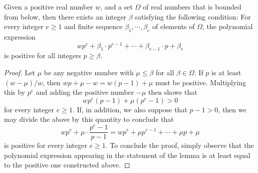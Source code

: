 \documentclass[11pt]{amsart}
\begin{document}
\newpage


\begin{lemma}
\label{positive polynomial: L}
Given a positive real number $w$, and a set $\Omega$ of real numbers that is bounded from below, then there exists an integer $\beta$ satisfying the following condition\textup:  For every integer $e \geq 1$ and finite sequence $\beta_1, \cdots, \beta_e$ of elements of $\Omega$, the polynomial expression \[ wp^{e} + \beta_1 \cdot p^{e-1} + \cdots + \beta_{e-1} \cdot p + \beta_e  \] is positive for all integers $p \geq \beta$.
\end{lemma}


\begin{proof}
Let $\mu$ be any negative number with $\mu \leq \beta$ for all $\beta \in \Omega$.    If $p$ is at least $(w-\mu)/w$, then $wp + \mu - w = w(p-1) + \mu$ must be positive.  Multiplying this by $p^e$ and adding the positive number $-\mu$ then shows that
%
\[ wp^e ( p-1 ) + \mu (p^e-1) > 0 \] for every integer $e \geq 1$.   If, in addition, we also suppose that $p -1 > 0$, then we may divide the above by this quantity to conclude that \[ w p^e + \mu \cdot \frac{ p^e - 1}{p-1} = wp^e + \mu p^{e-1} + \cdots + \mu p + \mu \] is positive for every integer $e \geq 1$.   To conclude the proof, simply observe that the polynomial expression appearing in the statement of the lemma is at least equal to the positive one constructed above.
\end{proof}


{\small


}	
\end{document}
